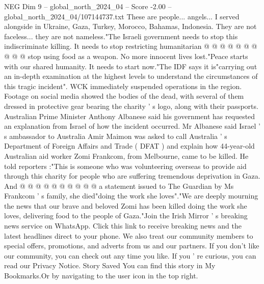 \begin{textsample}{NEG Dim 9 – global\_north\_2024\_04 – Score -2.00 – global\_north\_2024\_04/107144737.txt}
These are people... angels...
I served alongside in Ukraine, Gaza, Turkey, Morocco, Bahamas, Indonesia.
They are not faceless... they are not nameless."The Israeli government needs to stop this indiscriminate killing.
It needs to stop restricting humanitarian @ @ @ @ @ @ @ @ @ @ stop using food as a weapon.
No more innocent lives lost."Peace starts with our shared humanity.
It needs to start now."The IDF says it is"carrying out an in-depth examination at the highest levels to understand the circumstances of this tragic incident".
WCK immediately suspended operations in the region.
Footage on social media showed the bodies of the dead, with several of them dressed in protective gear bearing the charity ' s logo, along with their passports.
Australian Prime Minister Anthony Albanese said his government has requested an explanation from Israel of how the incident occurred.
Mr Albanese said Israel ' s ambassador to Australia Amir Maimon was asked to call Australia ' s Department of Foreign Affairs and Trade ( DFAT ) and explain how 44-year-old Australian aid worker Zomi Frankcom, from Melbourne, came to be killed.
He told reporters :"This is someone who was volunteering overseas to provide aid through this charity for people who are suffering tremendous deprivation in Gaza.
And @ @ @ @ @ @ @ @ @ @ a statement issued to The Guardian by Ms Frankcom ' s family, she died"doing the work she loves"."We are deeply mourning the news that our brave and beloved Zomi has been killed doing the work she loves, delivering food to the people of Gaza."Join the Irish Mirror ' s breaking news service on WhatsApp.
Click this link to receive breaking news and the latest headlines direct to your phone.
We also treat our community members to special offers, promotions, and adverts from us and our partners.
If you don't like our community, you can check out any time you like.
If you ' re curious, you can read our Privacy Notice.
Story Saved You can find this story in My Bookmarks.Or by navigating to the user icon in the top right.

\end{textsample}
